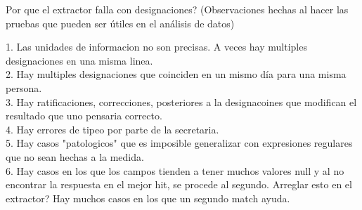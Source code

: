 \begin{comment}
\begin{table}[h]
\caption{Resultados detallados la evaluación del Preprocesador de Textos: Escalafón}
\centering
\scriptsize
\begin{tabular*}{.68\textwidth}{@{\extracolsep{\fill}} !{\vrule width 1pt} c !{\vrule width 1pt} c | c !{\vrule width 1pt} c | c !{\vrule width 1pt}}
\hline
Dominio & \multicolumn{2}{c!{\vrule width 1pt}}{\bf{Aprobados}} & \multicolumn{2}{c |}{\bf{No aprobados}}\\
\hline
 & Correctos & Con texto de más & Incompletos & Incorrectos \\
\hline
\multirow{2}{*}{Designaciones} & 80.51\% & 12.98\% & 6.4\% & 0\% \\\cline{2-5}
& \multicolumn{2}{c!{\vrule width 1pt}}{Aprobados: \bf{93.6}} & \multicolumn{2}{c |}{No aprobados: \bf{6.4\%}}\\
\hline 
\end{tabular*}
\label{tabla-resultados-preprocesamientoDatosEscalafon}
\\El conjunto de prueba es de tama~no 77, un tercio de la población.
\end{table}
\end{comment}



Por que el extractor falla con designaciones? (Observaciones hechas al hacer las pruebas que pueden ser útiles en el análisis de datos)

1. Las unidades de informacion no son precisas. A veces hay multiples designaciones en una misma linea. \\
2. Hay multiples designaciones que coinciden en un mismo día para una misma persona. \\
3. Hay ratificaciones, correcciones, posteriores a la designacoines que modifican el resultado que uno pensaria correcto.\\
4. Hay errores de tipeo por parte de la secretaria.\\
5. Hay casos "patologicos" que es imposible generalizar con expresiones regulares que no sean hechas a la medida. \\
6. Hay casos en los que los campos tienden a tener muchos valores null y al no encontrar la respuesta en el mejor hit, se procede al segundo. Arreglar esto en el extractor? Hay muchos casos en los que un segundo match ayuda. \\
